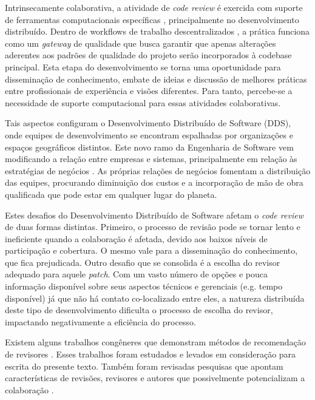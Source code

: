 \documentclass[a4paper,12pt]{monografia}
\theoremstyle{plain}
\theoremstyle{definition}
\theoremstyle{remark}
\begin{document}
Intrinsecamente colaborativa, a atividade de \textit{code review} é exercida com suporte de ferramentas computacionais específicas \cite{Bacchelli2013}, principalmente no desenvolvimento distribuído. Dentro de workflows de trabalho descentralizados \cite{gousios2016}, a prática funciona como um \textit{gateway} de qualidade que busca garantir que apenas alterações aderentes aos padrões de qualidade do projeto serão incorporados à codebase principal. Esta etapa do desenvolvimento se torna uma oportunidade para disseminação de conhecimento, embate de ideias e discussão de melhores práticas entre profissionais de experiência e visões diferentes. Para tanto, percebe-se a necessidade de suporte computacional para essas atividades colaborativas.

Tais aspectos configuram o Desenvolvimento Distribuído de Software (DDS), onde equipes de desenvolvimento se encontram espalhadas por organizações e espaços geográficos distintos. Este novo ramo da Engenharia de Software vem modificando a relação entre empresas e sistemas, principalmente em relação às estratégias de negócios \cite{audy2007}. As próprias relações de negócios fomentam a distribuição das equipes, procurando diminuição dos custos e a incorporação de mão de obra qualificada que pode estar em qualquer lugar do planeta.


Estes desafios do Desenvolvimento Distribuído de Software afetam o \textit{code review} de duas formas distintas. Primeiro, o processo de revisão pode se tornar lento e ineficiente quando a colaboração é afetada, devido aos baixos níveis de participação e cobertura. O mesmo vale para a disseminação do conhecimento, que fica prejudicada. Outro desafio que se consolida é a escolha do revisor adequado para aquele \textit{patch}. Com um vasto número de opções e pouca informação disponível sobre seus aspectos técnicos e gerenciais (e.g. tempo disponível) já que não há contato co-localizado entre eles, a natureza distribuída deste tipo de desenvolvimento dificulta o processo de escolha do revisor, impactando negativamente a eficiência do processo.

Existem alguns trabalhos congêneres que demonstram métodos de recomendação de revisores \cite{yu2014,Xia2015261,jiang2017}. Esses trabalhos foram estudados e levados em consideração para escrita do presente texto. Também foram revisadas pesquisas que apontam características de revisões, revisores e autores que possivelmente potencializam a colaboração \cite{Kemerer2009,Bird2015191,Baysal2013122}.
\end{document}
